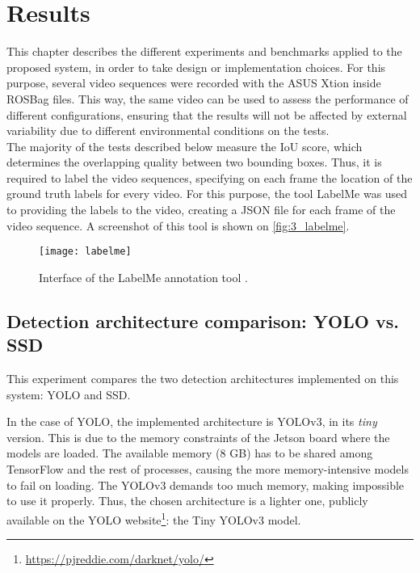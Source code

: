 \chapter{Results}
\label{chap:3_results}

This chapter describes the different experiments and benchmarks applied to the proposed system, in order to take design or implementation choices. For this purpose, several video sequences were recorded with the ASUS Xtion inside ROSBag files. This way, the same video can be used to assess the performance of different configurations, ensuring that the results will not be affected by external variability due to different environmental conditions on the tests.\\

The majority of the tests described below measure the IoU score, which determines the overlapping quality between two bounding boxes. Thus, it is required to label the video sequences, specifying on each frame the location of the ground truth labels for every video. For this purpose, the tool LabelMe \cite{labelme} was used to providing the labels to the video, creating a JSON file for each frame of the video sequence. A screenshot of this tool is shown on \autoref{fig:3_labelme}.


\begin{figure}[h]
	\centering
	\texttt{[image: labelme]}
	\caption{Interface of the LabelMe annotation tool \cite{labelme}.}
	\label{fig:3_labelme}
\end{figure}


\section{Detection architecture comparison: YOLO vs. SSD}
This experiment compares the two detection architectures implemented on this system: YOLO \cite{yolov3} and SSD\cite{ssd}.

In the case of YOLO, the implemented architecture is YOLOv3, in its \textit{tiny} version. This is due to the memory constraints of the Jetson board where the models are loaded. The available memory (8 GB) has to be shared among TensorFlow and the rest of processes, causing the more memory-intensive models to fail on loading. The YOLOv3 demands too much memory, making impossible to use it properly. Thus, the chosen architecture is a lighter one, publicly available on the YOLO website\footnote{\url{https://pjreddie.com/darknet/yolo/}}: the Tiny YOLOv3 model.


